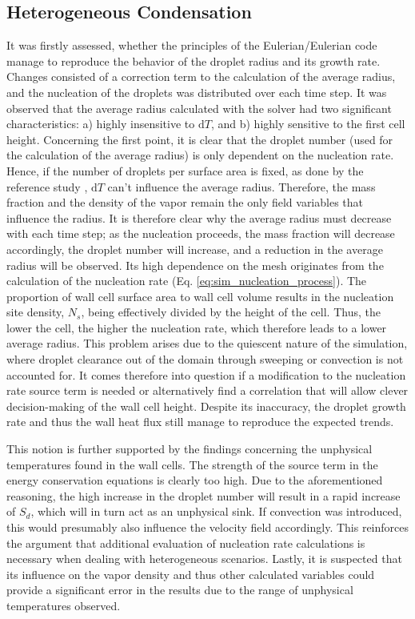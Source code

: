 \documentclass[12pt]{article}
\numberwithin{equation}{section}
\begin{document}
\subsection{Heterogeneous Condensation}
It was firstly assessed, whether the principles of the Eulerian/Eulerian code manage to reproduce the behavior of the droplet radius and its growth rate. Changes consisted of a correction term to the calculation of the average radius, and the nucleation of the droplets was distributed over each time step. It was observed that the average radius calculated with the solver had two significant characteristics: a) highly insensitive to $\mathrm{d}T$, and b) highly sensitive to the first cell height. Concerning the first point, it is clear that the droplet number (used for the calculation of the average radius) is only dependent on the nucleation rate. Hence, if the number of droplets per surface area is fixed, as done by the reference study \cite{liu2015dropwise}, $\mathrm{d}T$ can't influence the average radius. Therefore, the mass fraction and the density of the vapor remain the only field variables that influence the radius. It is therefore clear why the average radius must decrease with each time step; as the nucleation proceeds, the mass fraction will decrease accordingly, the droplet number will increase, and a reduction in the average radius will be observed. Its high dependence on the mesh originates from the calculation of the nucleation rate (Eq. \ref{eq:sim_nucleation_process}). The proportion of wall cell surface area to wall cell volume results in the nucleation site density, $N_{s}$, being effectively divided by the height of the cell. Thus, the lower the cell, the higher the nucleation rate, which therefore leads to a lower average radius. This problem arises due to the quiescent nature of the simulation, where droplet clearance out of the domain through sweeping or convection is not accounted for. It comes therefore into question if a modification to the nucleation rate source term is needed or alternatively find a correlation that will allow clever decision-making of the wall cell height. Despite its inaccuracy, the droplet growth rate and thus the wall heat flux still manage to reproduce the expected trends.

This notion is further supported by the findings concerning the unphysical temperatures found in the wall cells. The strength of the source term in the energy conservation equations is clearly too high. Due to the aforementioned reasoning, the high increase in the droplet number will result in a rapid increase of $S_{d}$, which will in turn act as an unphysical sink. If convection was introduced, this would presumably also influence the velocity field accordingly. This reinforces the argument that additional evaluation of nucleation rate calculations is necessary when dealing with heterogeneous scenarios. Lastly, it is suspected that its influence on the vapor density and thus other calculated variables could provide a significant error in the results due to the range of unphysical temperatures observed.
\end{document}
